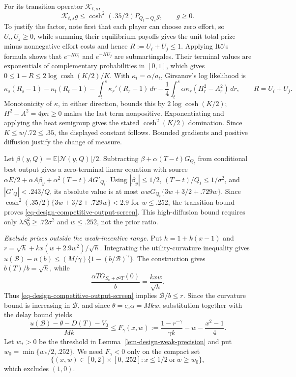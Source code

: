 \documentclass[mnsc]{informs3}
\begin{document}
\begin{APPENDICES}
{For its transition operator $\mathcal K_{t,s}$,
\[
\mathcal K_{t,s}g\leq\cosh^2(.35/2)P_{Q_t-Q_s}g,\qquad g\geq0.
\]
To justify the factor, note first that each player can choose zero effort,
so $U_i,U_j\geq0$, while summing their equilibrium payoffs gives the
unit total prize minus nonnegative effort costs and hence
$R:=U_i+U_j\leq1$. Applying It\^o's formula shows that
$e^{-KU_i}$ and $e^{-KU_j}$ are submartingales. Their terminal values are
exponentials of complementary probabilities in $[0,1]$, which gives
$0\leq1-R\leq2\log\cosh(K/2)/K$.
With $\kappa_t=\alpha/a_t$, Girsanov's log likelihood is
\[
\kappa_s(R_s-1)-\kappa_t(R_t-1)
-\int_t^s\kappa_r'(R_r-1)\,dr
-\frac14\int_t^s\alpha\kappa_r(H_r^2-A_r^2)\,dr,
\qquad R=U_i+U_j.
\]
Monotonicity of $\kappa$, in either direction, bounds this by
$2\log\cosh(K/2)$; $H^2-A^2=4pn\geq0$ makes the last term nonpositive.
Exponentiating and applying the heat semigroup gives the stated
$\cosh^2(K/2)$ domination. Since $K\leq w/.72\leq.35$, the displayed
constant follows. Bounded gradients and positive diffusion justify the
change of measure.

Let $\beta(y,Q)=\mathbb E|\mathcal N(y,Q)|/2$.
Subtracting $\beta+\alpha(T-t)G_{Q_t}$ from conditional best output
gives a zero-terminal linear equation with source
$\alpha E/2+\alpha A\beta_y+\alpha^2(T-t)AG'_{Q_t}$.
Using $|\beta_y|\leq1/2$, $(T-t)/Q_t\leq1/\sigma^2$, and
$|G'_Q|<.243/Q$, its absolute value is at most
$\alpha wG_{Q_t}\{3w+3/2+.729w\}$.
Since $\cosh^2(.35/2)\{3w+3/2+.729w\}<2.9$ for $w\leq.252$,
the transition bound proves \eqref{eq-design-competitive-output-screen}.
This high-diffusion bound requires only
$\lambda S_0^2\geq.72\sigma^2$ and $w\leq.252$, not the prior ratio.

\emph{Exclude prizes outside the weak-incentive range.}
Put $h=1+k(x-1)$ and
$r=\sqrt h+kx(w+2.9w^2)/\sqrt h$.
Integrating the utility-curvature inequality gives
$u(\mathcal B)-u(b)\leq(M/\gamma)\{1-(b/\mathcal B)^\gamma\}$.
The construction gives $b(T)/b=\sqrt h$, while
\[
\frac{\alpha T G_{S_0+\sigma^2T}(0)}b
=\frac{kxw}{\sqrt h}.
\]
Thus \eqref{eq-design-competitive-output-screen} implies
$\mathcal B/b\leq r$. Since the curvature bound is increasing in
$\mathcal B$, and since $\theta=c_e\alpha=Mkw$, substitution together
with the delay bound yields
\begin{equation}\label{eq-design-joint-exit-screen}
\frac{u(\mathcal B)-\theta-D(T)-V_0}{Mk}
\leq F_\gamma(x,w):=\frac{1-r^{-\gamma}}{\gamma k}
-w-\frac{x^2-1}{4}.
\end{equation}
Let $w_*>0$ be the threshold in Lemma~\ref{lem-design-weak-precision}
and put $w_0=\min\{w_*/2,.252\}$.
We need $F_\gamma<0$ only on the compact set
\[
\{(x,w)\in[0,2]\times[0,.252]:x\leq1/2\ \text{or}\ w\geq w_0\},
\]
which excludes $(1,0)$.

}
\end{APPENDICES}
\end{document}
